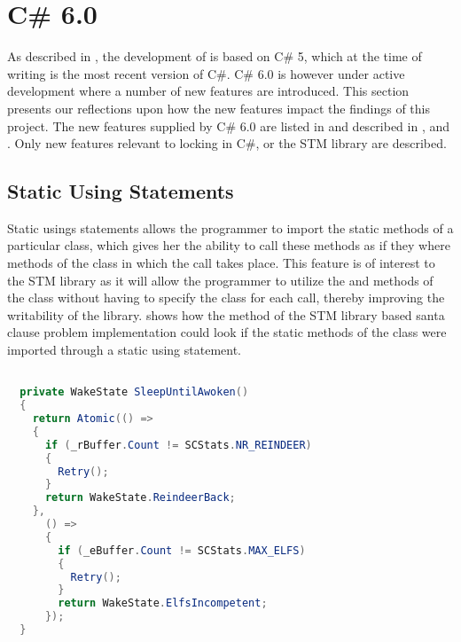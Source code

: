 \section{C\# 6.0}
As described in , the development of \stmname is based on C\# 5, which at the time of writing is the most recent version of C\#. C\# 6.0 is however under active development where a number of new features are introduced. This section presents our reflections upon how the new features impact the findings of this project. The new features supplied by C\# 6.0 are listed in \cite{csharp6Features} and described in \cite{csharp6one}, \cite{csharp6two} and \cite{csharp6featureDescription}. Only new features relevant to locking in C\#, \stmname or the \ac{STM} library are described. 

\subsection{Static Using Statements}
Static usings statements allows the programmer to import the static methods of a particular class, which gives her the ability to call these methods as if they where methods of the class in which the call takes place\cite{csharp6one}\cite{csharp6featureDescription}. This feature is of interest to the \ac{STM} library as it will allow the programmer to utilize the  and  methods of the  class without having to specify the class for each call, thereby improving the writability of the library.  shows how the  method of the \ac{STM} library based santa clause problem implementation could look if the static methods of the  class were imported through a static using statement.

\begin{lstlisting}[float,label=lst:static_using_example,
  caption={\ac{STM} library with static using statement},
  language=Java,  
  showspaces=false,
  showtabs=false,
  breaklines=true,
  showstringspaces=false,
  breakatwhitespace=true,
  escapechar=~,
  commentstyle=\color{greencomments},
  keywordstyle=\color{bluekeywords},
  stringstyle=\color{redstrings},
  morekeywords={atomic, retry, orelse, var, get, set, ref, out}]  % Start your code-block

  private WakeState SleepUntilAwoken()
  {
    return Atomic(() =>
    {
      if (_rBuffer.Count != SCStats.NR_REINDEER)
      {
        Retry();
      }
      return WakeState.ReindeerBack;
    },
      () =>
      {
        if (_eBuffer.Count != SCStats.MAX_ELFS)
        {
          Retry();
        }
        return WakeState.ElfsIncompetent;
      });
  }
\end{lstlisting}


